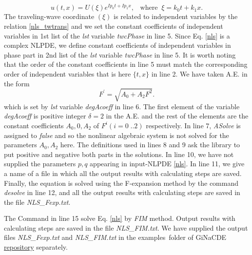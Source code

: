 \documentclass[prd,aps,floats,showkeys,nofootinbib,notitlepage]{revtex4}
\begin{document}
	\begin{equation}\label{nls_twtrans}
		u(t,x)=U(\xi)e^{Ip_0t+Ip_1x},\;\;\;\text{where}\;\;\xi=k_0t+k_1x.
	\end{equation}
	The traveling-wave coordinate $(\xi)$ is related to independent variables by the relation \eqref{nls_twtrans} and we set the constant coefficients of independent variables in 1st list of the {\em lst} variable {\em twcPhase} in line 5. Since Eq. \eqref{nls} is a complex NLPDE, we define constant coefficients of independent variables in phase part in 2nd list of the {\em lst} variable {\em twcPhase} in line 5. It is worth noting that the order of the constant coefficients in line 5 must match the corresponding order of independent variables that is here $\{t,x\}$ in line 2.
	We have taken A.E. in the form
	\begin{equation}\label{nlsAE}
		F^{\prime}=\sqrt{A_0+A_2F^2}.
	\end{equation}
	which is set by {\em lst} variable {\em degAcoeff} in line 6. The first element of the variable {\em degAcoeff} is positive integer $\delta=2$ in the A.E. and the rest of the elements are the constant coefficients $A_0,0,A_2$ of $F^i(i=0\;..2)$ respectively. In line 7, {\em ASolve} is assigned to {\em false} and so the nonlinear algebraic system is not solved for the parameters $A_0,A_2$ here. The definitions used in lines 8 and 9 ask the library to put positive and negative both parts in the solutions. In line 10, we have not supplied the parameters $p,q$ appearing in input-NLPDE \eqref{nls}.
	In line 11, we give a name of a file in which all the output results with calculating steps are saved.
	Finally, the equation is solved using the F-expansion method by the command {\em desolve} in line 12, and all the output results with calculating steps are saved in the file \emph{NLS{\_}Fexp.txt}. 
	\par The Command in line 15 solve Eq. \eqref{nls} by {\em FIM} method. 
	Output results with calculating steps are saved in the file \emph{NLS\_FIM.txt}. 
	We have supplied the output files \emph{NLS{\_}Fexp.txt} and \emph{NLS\_FIM.txt} in the examples\ folder of GiNaCDE \href{https://github.com/mithun218/GiNaCDE}{repository} separately.
\end{document}
